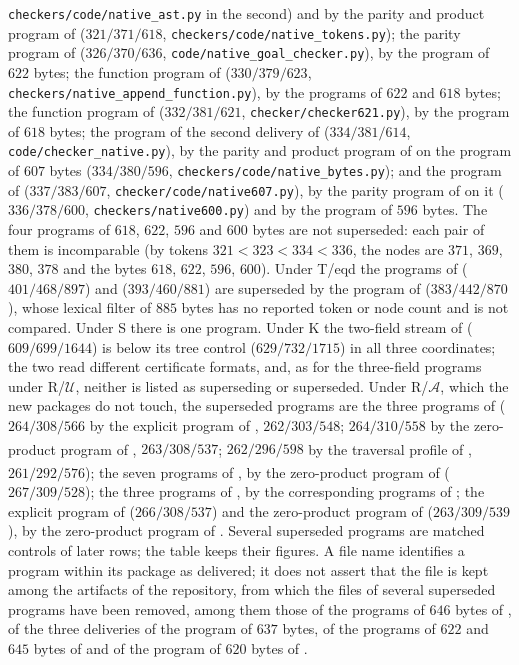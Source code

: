 \texttt{checkers/code/native\_ast.py} in the second) and by the parity and
product program of  ($321/371/618$,
\texttt{checkers/code/native\_tokens.py}); the parity program of
 ($326/370/636$,
\texttt{code/native\_goal\_checker.py}), by the program of $622$ bytes; the
function program of  ($330/379/623$,
\texttt{checkers/native\_append\_function.py}), by the programs of $622$ and
$618$ bytes; the function program of  ($332/381/621$,
\texttt{checker/checker621.py}), by the program of $618$ bytes; the program of
the second delivery of  ($334/381/614$,
\texttt{code/checker\_native.py}), by the parity and product program of
 on the program of $607$ bytes ($334/380/596$,
\texttt{checkers/code/native\_bytes.py}); and the program of
 ($337/383/607$, \texttt{checker/code/native607.py}),
by the parity program of  on it ($336/378/600$,
\texttt{checkers/native600.py}) and by the program of $596$ bytes. The four
programs of $618$, $622$, $596$ and $600$ bytes are not superseded: each pair of
them is incomparable (by tokens $321<323<334<336$, the nodes are $371$, $369$,
$380$, $378$ and the bytes $618$, $622$, $596$, $600$). Under T/eqd
the programs of  ($401/468/897$) and 
($393/460/881$) are superseded by the program of
 ($383/442/870$), whose lexical filter of $885$
bytes has no reported token or node count and is not compared. Under S there
is one program. Under K the two-field stream of 
($609/699/1644$) is below its tree control ($629/732/1715$) in all three
coordinates; the two read different certificate formats, and, as for the
three-field programs under R/$\mathcal U$, neither is listed as superseding or
superseded. Under R/$\mathcal A$, which the new packages do not touch, the
superseded programs are the three programs of 
($264/308/566$ by the explicit program of ,
$262/303/548$; $264/310/558$ by the zero-product program of
, $263/308/537$; $262/296/598$\textsuperscript{\dag} by
the traversal profile of ,
$261/292/576$\textsuperscript{\dag}); the seven programs of
, by the zero-product program of 
($267/309/528$); the three programs of , by the
corresponding programs of ; the explicit
program of  ($266/308/537$) and the zero-product program
of  ($263/309/539$), by the zero-product program
of . Several superseded programs are matched controls of
later rows; the table keeps their figures. A file name identifies a program
within its package as delivered; it does not assert that the file is kept
among the artifacts of the repository, from which the files of several
superseded programs have been removed, among them those of the programs of
$646$ bytes of , of the three deliveries of the
program of $637$ bytes, of the programs of $622$ and $645$ bytes of
 and of the program of $620$ bytes of .

